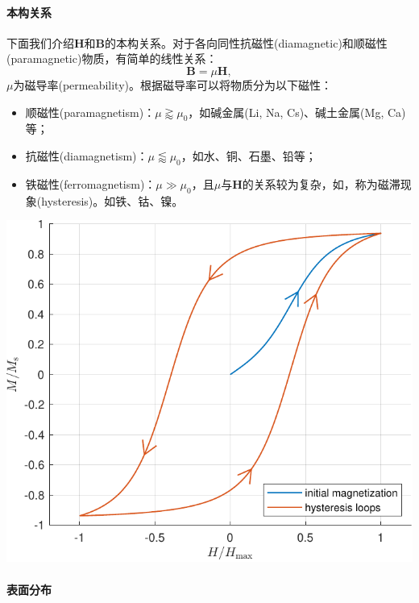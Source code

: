 \paragraph{本构关系}
下面我们介绍$\bm H$和$\bm B$的本构关系。对于各向同性抗磁性(diamagnetic)和顺磁性(paramagnetic)物质，有简单的线性关系：
\[
    \bm B=\mu\bm H,
\]
$\mu$为磁导率(permeability)。根据磁导率可以将物质分为以下磁性：
\begin{itemize}
    \item 顺磁性(paramagnetism)：$\mu\gtrapprox\mu_0$，如碱金属(Li, Na, Cs)、碱土金属(Mg, Ca)等；
    \item 抗磁性(diamagnetism)：$\mu\lessapprox\mu_0$，如水、铜、石墨、铅等；
    \item 铁磁性(ferromagnetism)：$\mu\gg\mu_0$，且$\mu$与$\bm H$的关系较为复杂，如，称为磁滞现象(hysteresis)。如铁、钴、镍。%
\end{itemize}
\begin{center}
    \includegraphics[width=0.5\linewidth]{graphs/hysteresis.pdf}
    \label{fig:hysteresis}
\end{center}

\paragraph{表面分布}


